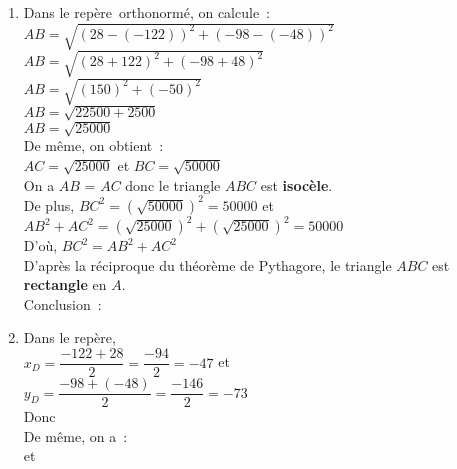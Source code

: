 \begin{minipage}{0.45\textwidth}
\thispagestyle{correction1}



\exercice
\begin{enumerate}
	\item Dans le repère~orthonormé, on calcule~:\\ $AB=\sqrt{\left(28 - \left( -122 \right) \right) ^ 2 + \left(-98 - \left( -48 \right) \right) ^ 2}$\\
			$AB=\sqrt{\left(28 + 122 \right) ^ 2 + \left(-98 + 48 \right) ^ 2}$\\
			$AB=\sqrt{\left(150 \right) ^ 2 + \left( - 50 \right) ^ 2}$\\
			$AB=\sqrt{22500 + 2500}$\\
			$AB=\sqrt{25000}$\\[1em]
			De même, on obtient~:\\ $AC = \sqrt{25000}$ et $BC = \sqrt{50000}$\\[1em]
			On a $AB$ = $AC$ donc le triangle $ABC$ est \textbf{isocèle}.\\[1em]
			De plus, $BC^2 = \left(\sqrt{50000}\right)^2 = 50000$ et\\ $AB^2 + AC^2 = \left(\sqrt{25000}\right)^2 + \left(\sqrt{25000}\right)^2 = 50000$\\
			D'où, $BC^2 = AB^2 + AC^2$\\
			D'après la réciproque du théorème de Pythagore, le triangle $ABC$ est \textbf{rectangle} en $A$.\\[1em]
			Conclusion~: \\
	\item Dans le repère,\\[1em]
			$x_D = \dfrac{-122 + 28}{2} = \dfrac{-94}{2} = -47$ et\\
			$y_D = \dfrac{-98 + (-48)}{2} = \dfrac{-146}{2} = -73$\\[1em]
			Donc \\[1em]
			De même, on a~:\\[1em]  et 
\end{enumerate}

\end{minipage}

